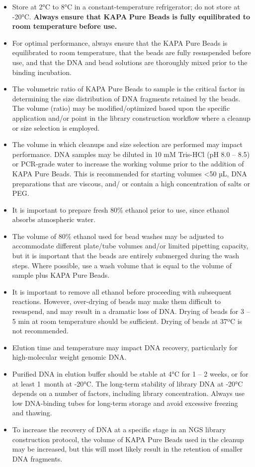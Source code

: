 \documentclass[
  letterpaper,
  DIV=11,
  numbers=noendperiod]{scrreprt}
\begin{document}

\begin{itemize}
\item
  Store at 2°C to 8°C in a constant-temperature refrigerator; do not
  store at -20°C. \textbf{Always ensure that KAPA} \textbf{Pure Beads is
  fully equilibrated to room temperature} \textbf{before use.}
\item
  For optimal performance, always ensure that the KAPA Pure Beads is
  equilibrated to room temperature, that the beads are fully resuspended
  before use, and that the DNA and bead solutions are thoroughly mixed
  prior to the binding incubation.
\item
  The volumetric ratio of KAPA Pure Beads to sample is the critical
  factor in determining the size distribution of DNA fragments retained
  by the beads. The volume (ratio) may be modified/optimized based upon
  the specific application and/or point in the library construction
  workflow where a cleanup or size selection is employed.
\item
  The volume in which cleanups and size selection are performed may
  impact performance. DNA samples may be diluted in 10 mM Tris-HCl (pH
  8.0 -- 8.5) or PCR-grade water to increase the working volume prior to
  the addition of KAPA Pure Beads. This is recommended for starting
  volumes \textless50 µL, DNA preparations that are viscous, and/ or
  contain a high concentration of salts or PEG.
\item
  It is important to prepare fresh 80\% ethanol prior to use, since
  ethanol absorbs atmospheric water.
\item
  The volume of 80\% ethanol used for bead washes may be adjusted to
  accommodate different plate/tube volumes and/or limited pipetting
  capacity, but it is important that the beads are entirely submerged
  during the wash steps. Where possible, use a wash volume that is equal
  to the volume of sample plus KAPA Pure Beads.
\item
  It is important to remove all ethanol before proceeding with
  subsequent reactions. However, over-drying of beads may make them
  difficult to resuspend, and may result in a dramatic loss of DNA.
  Drying of beads for 3 -- 5 min at room temperature should be
  sufficient. Drying of beads at 37ºC is not recommended.
\item
  Elution time and temperature may impact DNA recovery, particularly for
  high-molecular weight genomic DNA.
\item
  Purified DNA in elution buffer should be stable at 4°C for 1 -- 2
  weeks, or for at least 1~month at -20°C. The long-term stability of
  library DNA at -20°C depends on a number of factors, including library
  concentration. Always use low DNA-binding tubes for long-term storage
  and avoid excessive freezing and thawing.
\item
  To increase the recovery of DNA at a specific stage in an NGS library
  construction protocol, the volume of KAPA Pure Beads used in the
  cleanup may be increased, but this will most likely result in the
  retention of smaller DNA fragments.
\end{itemize}
\end{document}
